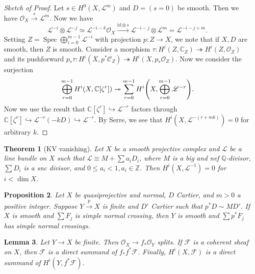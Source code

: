 \documentclass[leqno, openany]{memoir}
\newtheorem{thm}{Theorem}[section]
\newtheorem{prop}[thm]{Proposition}
\newtheorem{lem}[thm]{Lemma}
\theoremstyle{definition}
\theoremstyle{remark}
\theoremstyle{plain}
\theoremstyle{definition}
\theoremstyle{remark}
\newcommand{\C}{\mathbb{C}}
\newcommand{\Z}{\mathbb{Z}}
\newcommand{\Q}{\mathbb{Q}}
\newcommand{\msc}[1]{\mathscr{#1}}
\newcommand{\mr}[1]{\mathrm{#1}}
\DeclareMathOperator{\Spec}{Spec}
\begin{document}
\begin{proof}[Sketch of Proof]
    Let $s \in H^0(X, \msc{L}^m)$ and $D = (s=0)$ be smooth. Then we have $\msc{O}_X \xrightarrow{s} \msc{L}^m$. Now we have
    \[ \msc{L}^{-i} \otimes \msc{L}^{-j} \simeq \msc{L}^{-i-k} \msc{O}_X \xrightarrow{\mr{id} \otimes s} \msc{L}^{-i-j} \otimes \msc{L}^m = \msc{L}^{-i-j+m}. \]
    Setting $Z = \Spec \bigoplus_{i=0}^{m-1} \msc{L}^{-i}$ with projection $p \colon Z \to X$, we note that if $X, D$ are smooth, then $Z$ is smooth. Consider a morphism $\tau \colon H^i(Z, \C_Z) \twoheadrightarrow H^i(Z, \msc{O}_Z)$ and its pushforward $p_* \tau \colon H^i(X, p^* \msc{C}_Z) \twoheadrightarrow H^i(X, p_* \msc{O}_Z)$. Now we consider the surjection
    \[ \bigoplus_{r=0}^{m-1} H^i(X, \C[\zeta^r]) \twoheadrightarrow \sum_{r=0}^{m-1} H^i\qty(X, \bigoplus_{r=0}^{m-1} \msc{L}^{-r}). \]
    Now we use the result that $\C[\zeta^r] \hookrightarrow \msc{L}^{-r}$ factors through $\C[\zeta^r] \hookrightarrow \msc{L}^{-r}(-k D) \hookrightarrow \msc{L}^{-r}$. By Serre, we see that $H^i(X, \msc{L}^{-(r+mk)}) = 0$ for arbitrary $k$.
\end{proof}

\begin{thm}[KV vanishing]
    Let $X$ be a smooth projective complex and $\msc{L}$ be a line bundle on $X$ such that $\msc{L} \equiv M + \sum a_i D_i$, where $M$ is a big and nef $\Q$-divisor, $\sum D_i$ is a snc divisor, and $0 \leq a_i < 1, a_i \in \Z$. Then $H^i(X, \msc{L}^{-1}) = 0$ for $i < \dim X$.
\end{thm}

\begin{prop}
    Let $X$ be quasiprojective and normal, $D$ Cartier, and $m > 0$ a positive integer. Suppose $Y \xrightarrow{p} X$ is finite and $D'$ Cartier such that $p^* D \sim MD'$. If $X$ is smooth and $\sum F_j$ is simple normal crossing, then $Y$ is smooth and $\sum p^* F_j$ has simple normal crossings.
\end{prop}

\begin{lem}
    Let $Y \to X$ be finite. Then $\msc{O}_X \to f_* \msc{O}_Y$ splits. If $\msc{F}$ is a coherent sheaf on $X$, then $\msc{F}$ is a direct summand of $f_* f^* \msc{F}$. Finally, $H^i(X, \msc{F})$ is a direct summand of $H^i(Y, f^* \msc{F})$.
\end{lem}
\end{document}
